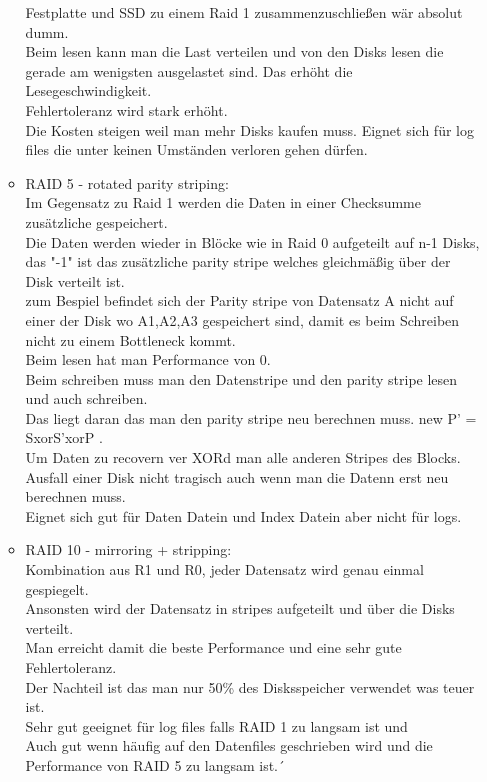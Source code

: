 \documentclass[12pt]{article}\pagestyle{myheadings}
\theoremstyle{plain}
\begin{document}
\begin{enumerate}
\begin{itemize}
Festplatte und SSD zu einem Raid 1 zusammenzuschließen wär absolut dumm.\\
Beim lesen kann man die Last verteilen und von den Disks lesen die gerade am wenigsten ausgelastet sind. Das erhöht die Lesegeschwindigkeit.\\
Fehlertoleranz wird stark erhöht.\\
Die Kosten steigen weil man mehr Disks kaufen muss.
Eignet sich für log files die unter keinen Umständen verloren gehen dürfen.\\
\item RAID 5 - rotated parity striping:\\
Im Gegensatz zu Raid 1 werden die Daten in einer Checksumme zusätzliche gespeichert.\\
Die Daten werden wieder in Blöcke wie in Raid 0 aufgeteilt auf n-1 Disks, das "-1" ist das zusätzliche parity stripe welches gleichmäßig über der Disk verteilt ist.\\
zum Bespiel befindet sich der Parity stripe von Datensatz A nicht auf einer der Disk wo A1,A2,A3 gespeichert sind, damit es beim Schreiben nicht zu einem Bottleneck kommt.\\
Beim lesen hat man Performance von 0.\\
Beim schreiben muss man den Datenstripe und den parity stripe lesen und auch schreiben.\\
Das liegt daran das man den parity stripe neu berechnen muss. new P' = SxorS'xorP .\\
Um Daten zu recovern ver XORd man alle anderen Stripes des Blocks.\\
Ausfall einer Disk nicht tragisch auch wenn man die Datenn erst neu berechnen muss.\\
Eignet sich gut für Daten Datein und Index Datein aber nicht für logs.\\
\item RAID 10 - mirroring + stripping:\\
Kombination aus R1 und R0, jeder Datensatz wird genau einmal gespiegelt.\\Ansonsten wird der Datensatz in stripes aufgeteilt und über die Disks verteilt.\\
Man erreicht damit die beste Performance und eine sehr gute Fehlertoleranz.\\
Der Nachteil ist das man nur 50\% des Disksspeicher verwendet was teuer ist.\\
Sehr gut geeignet für log files falls RAID 1 zu langsam ist und \\
Auch gut wenn häufig auf den Datenfiles geschrieben wird und die Performance von RAID 5 zu langsam ist.´



\end{itemize}
\end{enumerate}
\end{document}
